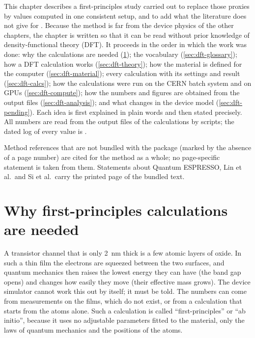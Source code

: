 This chapter describes a first-principles study carried out to replace those proxies by values computed in one
consistent setup, and to add what the literature does not give for \IWO. Because the method is far from the device
physics of the other chapters, the chapter is written so that it can be read without prior knowledge of
density-functional theory (DFT). It proceeds in the order in which the work was done: why the calculations are
needed (\cref{sec:dft-motivation}); the vocabulary (\cref{sec:dft-glossary}); how a DFT calculation works
(\cref{sec:dft-theory}); how the material is defined for the computer (\cref{sec:dft-material}); every calculation
with its settings and result (\cref{sec:dft-calcs}); how the calculations were run on the CERN batch system and on
GPUs (\cref{sec:dft-compute}); how the numbers and figures are obtained from the output files
(\cref{sec:dft-analysis}); and what changes in the device model (\cref{sec:dft-pending}). Each idea is first
explained in plain words and then stated precisely. All numbers are read from the output files of the calculations
by scripts; the dated log of every value is .

Method references that are not bundled with the package (marked by the absence of a page number) are cited for the
method as a whole; no page-specific statement is taken from them. Statements about Quantum ESPRESSO, Lin et al.\ and
Si et al.\ carry the printed page of the bundled text.

\section{Why first-principles calculations are needed}
\label{sec:dft-motivation}

\begin{dftplain}
A transistor channel that is only 2~nm thick is a few atomic layers of oxide. In such a thin film the electrons are
squeezed between the two surfaces, and quantum mechanics then raises the lowest energy they can have (the band gap
opens) and changes how easily they move (their effective mass grows). The device simulator cannot work this out by
itself; it must be told. The numbers can come from measurements on the films, which do not exist, or from a
calculation that starts from the atoms alone. Such a calculation is called ``first-principles'' or ``ab initio'',
because it uses no adjustable parameters fitted to the material, only the laws of quantum mechanics and the positions
of the atoms.
\end{dftplain}


